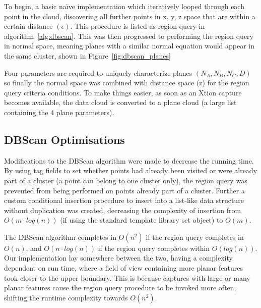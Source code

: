 \documentclass[]{article}
\begin{document}
{To begin, a basic naïve implementation which iteratively looped through each point in the cloud, discovering all further points in x, y, z space that are within a certain distance  $(\epsilon)$. This procedure is listed as region query in algorithm~\ref{alg:dbscan}. This was then progressed to performing the region query in normal space, meaning planes with a similar normal equation would appear in the same cluster, shown in Figure~\ref{fig:dbscan_planes}



Four parameters are required to uniquely characterize planes $(N_A, N_B, N_C, D)$ so finally the normal space was combined with distance space (z) for the region query criteria conditions. To make things easier, as soon as an Xtion capture becomes available, the data cloud is converted to a plane cloud (a large list  containing the 4 plane parameters).

\subsection{DBScan Optimisations} %
\label{sub:dbscan_optimisations}


Modifications to the DBScan algorithm were made to decrease the running time. By using tag fields to set whether points had already been visited or were already part of a cluster (a point can belong to one cluster only), the region query was prevented from being performed on points already part of a cluster. Further a  custom conditional insertion procedure to insert into a list-like data structure without duplication was created, decreasing the complexity of insertion from $O(m \cdot log(n))$ (if using the standard template library set object) to $O(m)$.

The DBScan algorithm completes in $O(n^2)$ if the region query completes in $O(n)$, and $O(n \cdot log(n))$ if the region query completes within $O(log(n))$. Our implementation lay somewhere between the two, having a complexity dependent on run time, where a field of view containing more planar features took closer to the upper boundary. This is because captures with large or many planar features cause the region query procedure to be invoked more often, shifting the runtime complexity towards $O(n^2)$.

}
\end{document}
